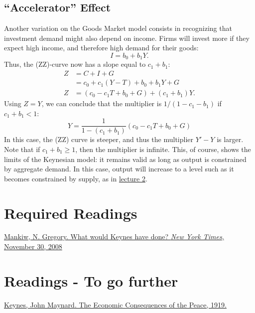 \documentclass[]{book}
\theoremstyle{definition}
\theoremstyle{definition}
\theoremstyle{definition}
\theoremstyle{remark}
\begin{document}
\hypertarget{accelerator}{\subsection{\texorpdfstring{``Accelerator''
Effect}{Accelerator Effect}}\label{accelerator}}

Another variation on the Goods Market model consists in recognizing that
investment demand might also depend on income. Firms will invest more if
they expect high income, and therefore high demand for their goods:
\[I=b_{0}+b_{1}Y.\] Thus, the (ZZ)-curve now has a slope equal to
\(c_1+b_1\): \[
\begin{aligned}
Z   &=C+I+G\\
    &=c_{0}+c_{1}\left(Y-T\right)+b_{0}+b_{1}Y+G\\
Z   &=\left(c_{0}-c_{1}T+b_{0}+G\right)+\left(c_{1}+b_{1}\right)Y.
\end{aligned}
\] Using \(Z=Y\), we can conclude that the multiplier is
\(1/(1-c_1-b_1)\) if \(c_{1}+b_{1}<1\):
\[Y=\frac{1}{1-\left(c_{1}+b_{1}\right)}\left(c_{0}-c_{1}T+b_{0}+G\right)\]
In this case, the (ZZ) curve is steeper, and thus the multiplier
\(Y'-Y\) is larger. Note that if \(c_{1}+b_{1}\geq1\), then the
multiplier is infinite. This, of course, shows the limits of the
Keynesian model: it remains valid as long as output is constrained by
aggregate demand. In this case, output will increase to a level such as
it becomes constrained by supply, as in
\protect\hyperlink{solow}{lecture 2}.

\section*{Required Readings}\label{required-readings}

\href{https://search.proquest.com/docview/433963341/fulltext/43832006CCFE4D96PQ/1?accountid=14512}{Mankiw,
N. Gregory. What would Keynes have done? \emph{New York Times}, November
30, 2008}

\section*{Readings - To go further}\label{readings---to-go-further-4}

\href{https://socialsciences.mcmaster.ca/econ/ugcm/3ll3/keynes/pdf\%26filename\%3Dpeace3.pdf}{Keynes,
John Maynard. The Economic Consequences of the Peace, 1919.}
\end{document}
